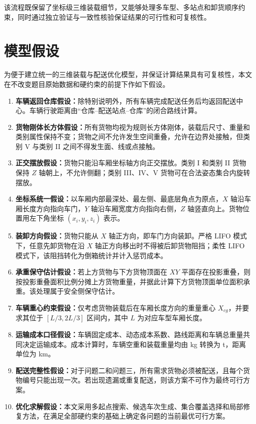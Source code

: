 ﻿\documentclass[UTF8,a4paper,12pt]{ctexart}
\begin{document}
	该流程既保留了坐标级三维装载细节，又能够处理多车型、多站点和卸货顺序约束，同时通过独立验证与一致性核验保证结果的可行性和可复核性。
	
	\section{模型假设}
	
	为便于建立统一的三维装载与配送优化模型，并保证计算结果具有可复核性，本文在不改变题目原始数据和硬约束的前提下作如下假设。
	
	\begin{enumerate}
		\item \textbf{车辆返回仓库假设：}除特别说明外，所有车辆完成配送任务后均返回配送中心。车辆行驶距离由“仓库--配送站点--仓库”的闭合路线计算。
		
		\item \textbf{货物刚体长方体假设：}所有货物均视为规则长方体刚体，装载后尺寸、重量和类别属性保持不变；货物之间不允许发生空间重叠，允许在边界处接触，但类别 V 与类别 II 之间不得发生面、线或点接触。
		
		\item \textbf{正交摆放假设：}货物只能沿车厢坐标轴方向正交摆放。类别 I 和类别 II 货物保持 $Z$ 轴朝上，不允许侧翻；类别 III、IV、V 货物可在合法姿态集合内旋转摆放。
		
		\item \textbf{坐标系统一假设：}以车厢内部最深处、最左侧、最底层角点为原点，$X$ 轴沿车厢长度方向指向车门，$Y$ 轴沿车厢宽度方向指向右侧，$Z$ 轴竖直向上。货物位置用左下角坐标 $(x_i,y_i,z_i)$ 表示。
		
		\item \textbf{装卸方向假设：}货物只能从 $X$ 轴正方向，即车门方向装卸。严格 LIFO 模式下，任意先卸货物在沿 $X$ 轴正方向移出时不得被后卸货物阻挡；柔性 LIFO 模式下，该阻挡转化为倒箱统计并计入惩罚成本。
		
		\item \textbf{承重保守估计假设：}若上方货物与下方货物顶面在 $XY$ 平面存在投影重叠，则按投影重叠面积比例分摊上方货物重量，并据此计算下方货物顶面单位面积承重。该处理属于安全侧保守估计。
		
		\item \textbf{车辆重心约束假设：}仅考虑货物装载后在车厢长度方向的重量重心 $X_{cg}$，并要求其位于 $[L/3,2L/3]$ 区间内，其中 $L$ 为对应车型车厢长度。
		
		\item \textbf{运输成本口径假设：}车辆固定成本、动态成本系数、路线距离和车辆总重量共同决定运输成本。成本计算时，车辆空重和装载重量均由 kg 转换为 t，距离单位为 km。
		
		\item \textbf{配送完整性假设：}对于问题二和问题三，所有需求货物必须被配送，且每个货物编号只能出现一次。若出现遗漏或重复配送，则该方案不可作为最终可行方案。
		
		\item \textbf{优化求解假设：}本文采用多起点搜索、候选车次生成、集合覆盖选择和局部修复方法，在满足全部硬约束的基础上确定各问题的当前最优可行方案。
	\end{enumerate}
	
\end{document}
